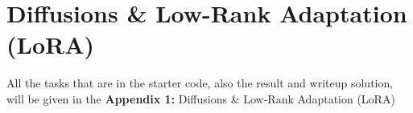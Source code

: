 \documentclass[a4paper, 10pt]{article}
\begin{document}
\subject[2110573 - Pattern Recognition]


\section{Diffusions \& Low-Rank Adaptation (LoRA)}


All the tasks that are in the starter code, also the result and writeup solution,
will be given in the \textbf{Appendix 1:} Diffusions \& Low-Rank Adaptation (LoRA)



\end{document}
